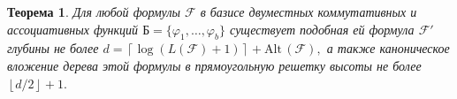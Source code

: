 \documentclass[12pt, a4paper]{article}
\theoremstyle{plain}
\newtheorem{theorem}{Теорема}
\theoremstyle{definition}
\theoremstyle{definition}
\newcommand{\floor}[1]{\left\lfloor{#1}\right\rfloor}
\newcommand{\ceil}[1]{\left\lceil{#1}\right\rceil}
\newcommand{\ZZ}{\mathbb{Z}}
\renewcommand{\le}{\leqslant}
\renewcommand{\phi}{\varphi}
\newcommand{\Alt}{\mathrm{Alt}\,}
\newcommand{\F}{\mathscr{F}}
\begin{document}
%
%
%
% 
%
% 
\begin{theorem}
	\label{thm:full}
 Для любой формулы $\F$ в базисе двуместных коммутативных и ассоциативных
функций $Б = \{\phi_1, \dots, \phi_b \}$ существует подобная ей формула $\F'$ глубины
не более $d = \ceil{\log (L(\F) + 1)} + \Alt(\F),$
а также каноническое вложение дерева этой формулы в прямоугольную решетку высоты не более
$
	\floor{d / 2} + 1.	
$
\end{theorem}
\end{document}
